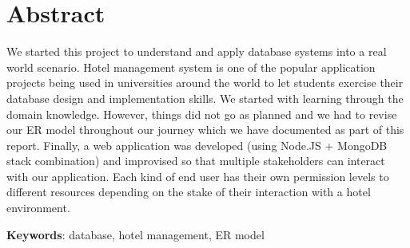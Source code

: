 
\chapter*{Abstract}

We started this project to understand and apply database systems into a real world scenario. Hotel management system is one of the popular application projects being used in universities around the world to let students exercise their database design and implementation skills. We started with learning through the domain knowledge. However, things did not go as planned and we had to revise our ER model throughout our journey which we have documented as part of this report. Finally, a web application was developed (using Node.JS + MongoDB stack combination) and improvised so that multiple stakeholders can interact with our application. Each kind of end user has their own permission levels to different resources depending on the stake of their interaction with a hotel environment.

\textbf{Keywords}: database, hotel management, ER model


\clearpage
